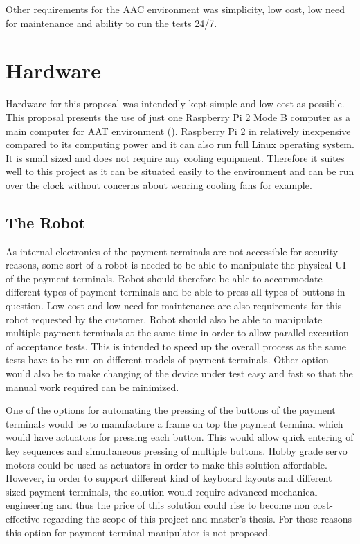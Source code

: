 Other requirements for the AAC environment was simplicity, low cost, low need for maintenance and ability to run the tests 24/7.

\section{Hardware}
\label{section:Proposed hardware}

Hardware for this proposal was intendedly kept simple and low-cost as possible. This proposal presents the use of just one Raspberry Pi 2 Mode B computer as a main computer for AAT environment (\emph{\cite{raspberry}}). Raspberry Pi 2 in relatively inexpensive compared to its computing power and it can also run full Linux operating system. It is small sized and does not require any cooling equipment. Therefore it suites well to this project as it can be situated easily to the environment and can be run over the clock without concerns about wearing cooling fans for example.

\FloatBarrier
\subsection{The Robot}
\label{subsection:The Robot proposal}

As internal electronics of the payment terminals are not accessible for security reasons, some sort of a robot is needed to be able to manipulate the physical UI of the payment terminals. Robot should therefore be able to accommodate different types of payment terminals and be able to press all types of buttons in question. Low cost and low need for maintenance are also requirements for this robot requested by the customer. Robot should also be able to manipulate multiple payment terminals at the same time in order to allow parallel execution of acceptance tests. This is intended to speed up the overall process as the same tests have to be run on different models of payment terminals. Other option would also be to make changing of the device under test easy and fast so that the manual work required can be minimized.

One of the options for automating the pressing of the buttons of the payment terminals would be to manufacture a frame on top the payment terminal which would have actuators for pressing each button. This would allow quick entering of key sequences and simultaneous pressing of multiple buttons. Hobby grade servo motors could be used as actuators in order to make this solution affordable. However, in order to support different kind of keyboard layouts and different sized payment terminals, the solution would require advanced mechanical engineering and thus the price of this solution could rise to become non cost-effective regarding the scope of this project and master's thesis. For these reasons this option for payment terminal manipulator is not proposed.

